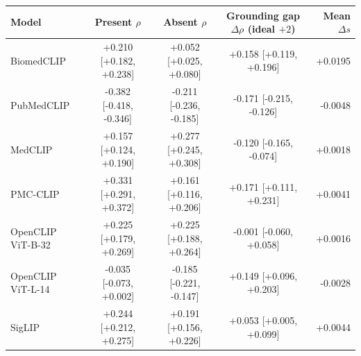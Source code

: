 \begin{tabular}{lcccr}
\toprule
Model & Present $\rho$ & Absent $\rho$ & Grounding gap $\Delta\rho$ (ideal $+2$) & Mean $\Delta s$ \\
\midrule
BiomedCLIP & +0.210 [+0.182, +0.238] & +0.052 [+0.025, +0.080] & +0.158 [+0.119, +0.196] & +0.0195 \\
PubMedCLIP & -0.382 [-0.418, -0.346] & -0.211 [-0.236, -0.185] & -0.171 [-0.215, -0.126] & -0.0048 \\
MedCLIP & +0.157 [+0.124, +0.190] & +0.277 [+0.245, +0.308] & -0.120 [-0.165, -0.074] & +0.0018 \\
PMC-CLIP & +0.331 [+0.291, +0.372] & +0.161 [+0.116, +0.206] & +0.171 [+0.111, +0.231] & +0.0041 \\
OpenCLIP ViT-B-32 & +0.225 [+0.179, +0.269] & +0.225 [+0.188, +0.264] & -0.001 [-0.060, +0.058] & +0.0016 \\
OpenCLIP ViT-L-14 & -0.035 [-0.073, +0.002] & -0.185 [-0.221, -0.147] & +0.149 [+0.096, +0.203] & -0.0028 \\
SigLIP & +0.244 [+0.212, +0.275] & +0.191 [+0.156, +0.226] & +0.053 [+0.005, +0.099] & +0.0044 \\
\bottomrule
\end{tabular}
